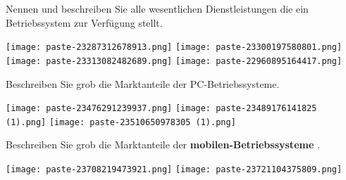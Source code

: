 \documentclass{article}
\begin{document}
\begin{tcolorbox}[colback=white!10!white,colframe=lightgray!75!black,
  savelowerto=\jobname_ex.tex,breakable,enhanced,lines before break=40]

\begin{center}
Nennen und beschreiben Sie alle wesentlichen Dienstleistungen die ein Betriebssystem zur Verfügung stellt.

\end{center}

\tcblower

\justifying
\texttt{[image: paste-23287312678913.png]}
\texttt{[image: paste-23300197580801.png]}
\texttt{[image: paste-23313082482689.png]}
\texttt{[image: paste-22960895164417.png]}

\end{tcolorbox}
\begin{tcolorbox}[colback=white!10!white,colframe=lightgray!75!black,
  savelowerto=\jobname_ex.tex,breakable,enhanced,lines before break=40]

\begin{center}
Beschreiben Sie grob die Marktanteile der PC-Betriebssysteme.

\end{center}

\tcblower

\justifying
\texttt{[image: paste-23476291239937.png]}
\texttt{[image: paste-23489176141825 (1).png]}
\texttt{[image: paste-23510650978305 (1).png]}

\end{tcolorbox}
\begin{tcolorbox}[colback=white!10!white,colframe=lightgray!75!black,
  savelowerto=\jobname_ex.tex,breakable,enhanced,lines before break=40]

\begin{center}
Beschreiben Sie grob die Marktanteile der 
\textbf{mobilen-Betriebssysteme
}.

\end{center}

\tcblower

\justifying
\texttt{[image: paste-23708219473921.png]}
\texttt{[image: paste-23721104375809.png]}

\end{tcolorbox}
\end{document}
